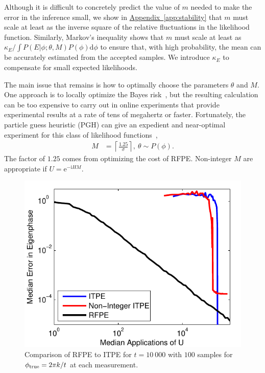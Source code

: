 \documentclass[aps,pra,amsmath,twocolumn,amssymb,superscriptaddress]{revtex4-1}
\newcommand{\app}[1]{\hyperref[app:#1]{Appendix~\ref*{app:#1}}}
\newcommand{\ii}{\mathrm{i}}
\newcommand{\ee}{\mathrm{e}}
\begin{document}
Although it is difficult to concretely predict the value of $m$ needed to make the error in the inference small, we show in \app{stability} that $m$ must scale at least as the inverse square of the relative fluctuations in the likelihood function.  Similarly, Markov's inequality shows that $m$ must scale at least as $\kappa_E/\int P(E|\phi;\theta,M)P(\phi) \mathrm{d}\phi$ to ensure that, with high probability, the mean can be accurately estimated from the accepted samples.  We introduce $\kappa_E$ to compensate for small expected likelihoods.

The main issue that remains is how to optimally choose the parameters $\theta$
and $M$. One approach is to locally optimize the Bayes
risk~\cite{granade_robust_2012}, but the resulting calculation can be too
expensive to carry out in online experiments that provide experimental results
at a rate of tens of megahertz or faster.  Fortunately, the particle guess heuristic (PGH) can give an
expedient and
near-optimal experiment for this class of likelihood
functions~\cite{wiebe_hamiltonian_2014},
\begin{align}
    M &= \left\lceil\frac{1.25}{\sigma}\right\rceil,~
    \theta \sim P(\phi).\label{eq:PGH}
\end{align}
The factor of $1.25$ comes from optimizing the cost of RFPE.   Non-integer $M$
are appropriate if $U=\ee^{-\ii H M}$.

\begin{figure}[t!]
    \begin{centering}
        \includegraphics[width=0.723\linewidth]{ITPEcmp.pdf}
    \end{centering}
    \caption{\label{fig:ITPEcmp}
     Comparison of RFPE to ITPE for $t=10~000$ with $100$ samples for $\phi_{\rm true} = 2\pi k/t$ at each measurement.  
    }
\end{figure}
\end{document}
